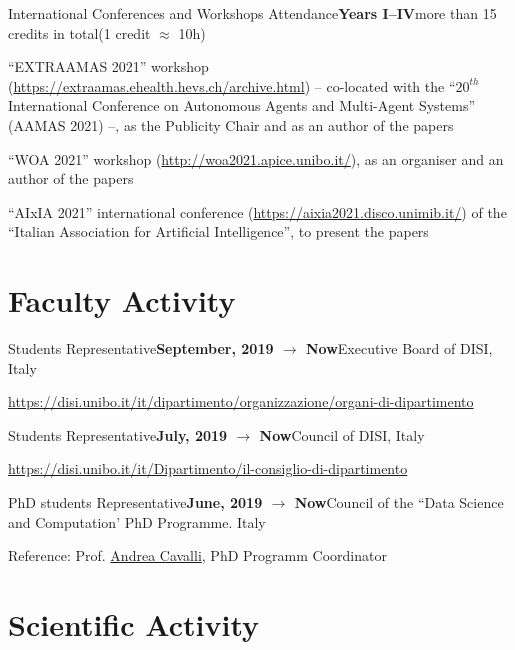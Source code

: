 \begin{activity}{International Conferences and Workshops Attendance}{\textbf{Years I--IV}}{more than 15 credits in total}{(1 credit $\approx$ 10h)}
    \item ``EXTRAAMAS 2021'' workshop (\url{https://extraamas.ehealth.hevs.ch/archive.html}) -- co-located with the ``$20^{th}$ International Conference on Autonomous Agents and Multi-Agent Systems'' (AAMAS 2021) --, as the Publicity Chair and as an author of the papers \cite{imagination-extraamas2021,shallow2deep-extraamas2021,gridex-extraamas2021}
    \item ``WOA 2021'' workshop (\url{http://woa2021.apice.unibo.it/}), as an organiser and an author of the papers \cite{psyke-woa2021,gnn-woa2021}
    \item ``AIxIA 2021'' international conference (\url{https://aixia2021.disco.unimib.it/}) of the ``Italian Association for Artificial Intelligence'', to present the papers \cite{dcc-aixia-2021-plp}
\end{activity}

\section*{Faculty Activity}

\begin{activity}{Students Representative}{\textbf{September, 2019 $\rightarrow$ Now}}{Executive Board of DISI}{\uniboen, Italy}
    \item \url{https://disi.unibo.it/it/dipartimento/organizzazione/organi-di-dipartimento}
\end{activity}

\begin{activity}{Students Representative}{\textbf{July, 2019 $\rightarrow$ Now}}{Council of DISI}{\uniboen, Italy}
    \item \url{https://disi.unibo.it/it/Dipartimento/il-consiglio-di-dipartimento}
\end{activity}

\begin{activity}{PhD students Representative}{\textbf{June, 2019 $\rightarrow$ Now}}{Council of the ``Data Science and Computation' PhD Programme}{\uniboen. Italy}
    \item Reference: Prof. \href{mailto:andrea.cavalli@unibo.it}{Andrea Cavalli}, PhD Programm Coordinator
\end{activity}


\section*{Scientific Activity}

